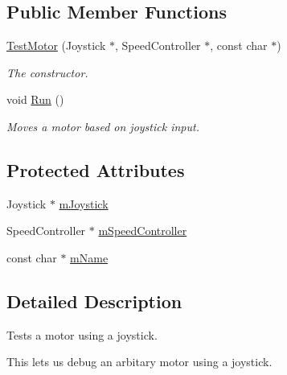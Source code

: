 \subsection*{\-Public \-Member \-Functions}
\begin{DoxyCompactItemize}
\item 
\hyperlink{class_test_motor_ae4850e2b0f1907c3c683a20525e065a4}{\-Test\-Motor} (\-Joystick $\ast$, \-Speed\-Controller $\ast$, const char $\ast$)
\begin{DoxyCompactList}\small\item\em \-The constructor. \end{DoxyCompactList}\item 
void \hyperlink{class_test_motor_a6e754aea6e9feb2b0d0326f9466c9eba}{\-Run} ()
\begin{DoxyCompactList}\small\item\em \-Moves a motor based on joystick input. \end{DoxyCompactList}\end{DoxyCompactItemize}
\subsection*{\-Protected \-Attributes}
\begin{DoxyCompactItemize}
\item 
\-Joystick $\ast$ \hyperlink{class_test_motor_a75510c1fcd2f565c91fe411e7a70feec}{m\-Joystick}
\item 
\-Speed\-Controller $\ast$ \hyperlink{class_test_motor_a1e4141787aa5841e60e06f499b54922d}{m\-Speed\-Controller}
\item 
const char $\ast$ \hyperlink{class_test_motor_a3825dab6e71bc4470ea52044f74e052d}{m\-Name}
\end{DoxyCompactItemize}


\subsection{\-Detailed \-Description}
\-Tests a motor using a joystick. 

\-This lets us debug an arbitary motor using a joystick. 

